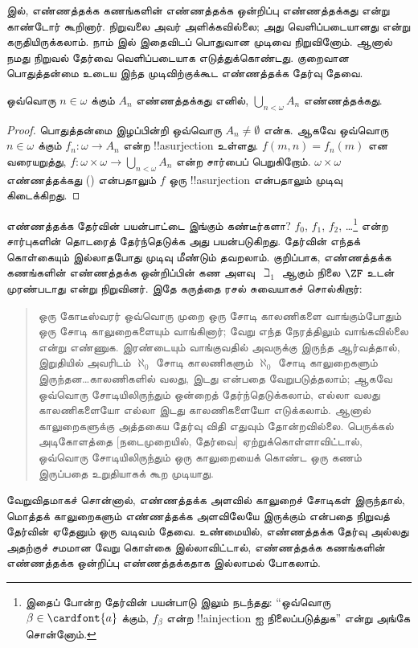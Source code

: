 \documentclass[../../../include/open-logic-section]{subfiles}
\begin{document}
\begin{ex}
\citeyear{Cantor1878} இல், எண்ணத்தக்க கணங்களின்
எண்ணத்தக்க ஒன்றிப்பு எண்ணத்தக்கது என்று காண்டோர் கூறினார்.
நிறுவலை அவர் அளிக்கவில்லை; அது வெளிப்படையானது என்று
கருதியிருக்கலாம். நாம் 
இல் இதைவிடப் பொதுவான முடிவை நிறுவினோம். ஆனால் நமது
நிறுவல் தேர்வை வெளிப்படையாக எடுத்துக்கொண்டது. குறைவான
பொதுத்தன்மை உடைய இந்த முடிவிற்குக்கூட எண்ணத்தக்க தேர்வு
தேவை.

\begin{thm}
ஒவ்வொரு $n \in \omega$ க்கும் $A_n$ எண்ணத்தக்கது எனில்,
$\bigcup_{n < \omega} A_n$ எண்ணத்தக்கது.
\end{thm}

\begin{proof}
பொதுத்தன்மை இழப்பின்றி ஒவ்வொரு $A_n \neq \emptyset$
என்க. ஆகவே ஒவ்வொரு $n \in \omega$ க்கும்
$f_n \colon \omega \to A_n$ என்ற !!a{surjection}
உள்ளது. $f(m, n) = f_n(m)$ என வரையறுத்து,
$f \colon \omega \times \omega \to \bigcup_{n < \omega} A_n$
என்ற சார்பைப் பெறுகிறோம். $\omega \times \omega$
எண்ணத்தக்கது
() என்பதாலும்
$f$ ஒரு !!a{surjection} என்பதாலும் முடிவு கிடைக்கிறது.
\end{proof}
\noindent

எண்ணத்தக்க தேர்வின் பயன்பாட்டை இங்கும் கண்டீர்களா?
$f_0$, $f_1$, $f_2$, \dots\footnote{இதைப் போன்ற தேர்வின்
பயன்பாடு 
இலும் நடந்தது: ``ஒவ்வொரு $\beta \in \cardfont{a}$ க்கும்,
$f_\beta$ என்ற !!a{injection} ஐ நிலைப்படுத்துக'' என்று
அங்கே சொன்னோம்.} என்ற சார்புகளின் தொடரைத் தேர்ந்தெடுக்க
அது பயன்படுகிறது. தேர்வின் எந்தக் கொள்கையும் இல்லாதபோது
முடிவு மீண்டும் தவறலாம். குறிப்பாக, எண்ணத்தக்க கணங்களின்
எண்ணத்தக்க ஒன்றிப்பின் கண அளவு~$\beth_1$ ஆகும் நிலை
$\ZF$ உடன் முரண்படாது என்று
\citet{FefermanLevy1963} நிறுவினர். இதே கருத்தை
ரசல் சுவையாகச் சொல்கிறார்:
\begin{quote}
  ஒரு கோடீஸ்வரர் ஒவ்வொரு முறை ஒரு சோடி காலணிகளை
  வாங்கும்போதும் ஒரு சோடி காலுறைகளையும் வாங்கினார்;
  வேறு எந்த நேரத்திலும் வாங்கவில்லை என்று எண்ணுக.
  இரண்டையும் வாங்குவதில் அவருக்கு இருந்த ஆர்வத்தால்,
  இறுதியில் அவரிடம் $\aleph_0$ சோடி காலணிகளும்
  $\aleph_0$ சோடி காலுறைகளும் இருந்தன\dots\@ காலணிகளில்
  வலது, இடது என்பதை வேறுபடுத்தலாம்; ஆகவே ஒவ்வொரு
  சோடியிலிருந்தும் ஒன்றைத் தேர்ந்தெடுக்கலாம், எல்லா
  வலது காலணிகளையோ எல்லா இடது காலணிகளையோ எடுக்கலாம்.
  ஆனால் காலுறைகளுக்கு அத்தகைய தேர்வு விதி எதுவும்
  தோன்றவில்லை. பெருக்கல் அடிகோளத்தை [நடைமுறையில்,
  தேர்வை] ஏற்றுக்கொள்ளாவிட்டால், ஒவ்வொரு சோடியிலிருந்தும்
  ஒரு காலுறையைக் கொண்ட ஒரு கணம் இருப்பதை உறுதியாகக்
  கூற முடியாது.
  \citep[p.~126]{Russell1919}
\end{quote}
வேறுவிதமாகச் சொன்னால், எண்ணத்தக்க அளவில் காலுறைச்
சோடிகள் இருந்தால், மொத்தக் காலுறைகளும் எண்ணத்தக்க
அளவிலேயே இருக்கும் என்பதை நிறுவத் தேர்வின் ஏதேனும்
ஒரு வடிவம் தேவை. உண்மையில், எண்ணத்தக்க தேர்வு அல்லது
அதற்குச் சமமான வேறு கொள்கை இல்லாவிட்டால்,
எண்ணத்தக்க கணங்களின் எண்ணத்தக்க ஒன்றிப்பு எண்ணத்தக்கதாக
இல்லாமல் போகலாம்.
\end{ex}
\end{document}
